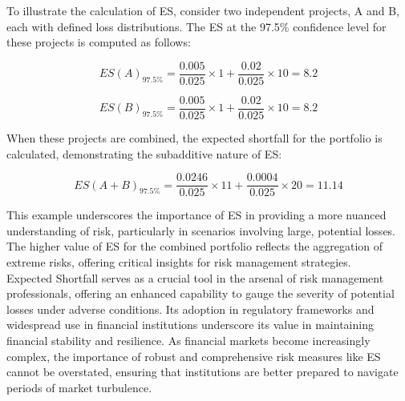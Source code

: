 \documentclass[a4paper,10pt]{article}
\begin{document}
\noindent To illustrate the calculation of ES, consider two independent projects, A and B, each with defined loss distributions. The ES at the 97.5\% confidence level for these projects is computed as follows:

\[ ES(A)_{97.5\%} = \frac{0.005}{0.025} \times 1 + \frac{0.02}{0.025} \times 10 = 8.2 \]

\[ ES(B)_{97.5\%} = \frac{0.005}{0.025} \times 1 + \frac{0.02}{0.025} \times 10 = 8.2 \]

When these projects are combined, the expected shortfall for the portfolio is calculated, demonstrating the subadditive nature of ES:

\[ ES(A + B)_{97.5\%} = \frac{0.0246}{0.025} \times 11 + \frac{0.0004}{0.025} \times 20 = 11.14 \]

\noindent This example underscores the importance of ES in providing a more nuanced understanding of risk, particularly in scenarios involving large, potential losses. The higher value of ES for the combined portfolio reflects the aggregation of extreme risks, offering critical insights for risk management strategies.\\

\noindent Expected Shortfall serves as a crucial tool in the arsenal of risk management professionals, offering an enhanced capability to gauge the severity of potential losses under adverse conditions. Its adoption in regulatory frameworks and widespread use in financial institutions underscore its value in maintaining financial stability and resilience. As financial markets become increasingly complex, the importance of robust and comprehensive risk measures like ES cannot be overstated, ensuring that institutions are better prepared to navigate periods of market turbulence.\\
\end{document}
